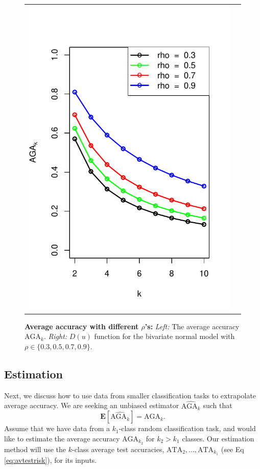 \documentclass[twoside,11pt]{article}
\newcommand{\E}{\textbf{E}}
\begin{document}
\begin{figure}[p]
\begin{tabular}{cc}
\includegraphics[scale = 0.6, clip = true, trim = 0.0in 0 0.2in 0.6in]{illus_rhos_avrisk.pdf}
\end{tabular}

\caption{\textbf{Average accuracy with different $\rho$'s:}
\emph{Left:} The average accuracy $\text{AGA}_k$. \emph{Right:} ${D}(u)$ function for the bivariate normal model with $\rho \in \{0.3, 0.5, 0.7, 0.9\}$.
}\label{fig:toy4}
\end{figure}

\subsection{Estimation}\label{sec:extrapolation_estimation}

Next, we discuss how to use data from smaller classification tasks to
extrapolate average accuracy.  
We are seeking an unbiased estimator $\widehat{\text{AGA}_k}$
such that %
\[
\E[\widehat{\text{AGA}_k}] = \text{AGA}_k.
\]
Assume that we have data from a
$k_1$-class random classification task, and would like to estimate the
average accuracy $\text{AGA}_{k_2}$ for $k_2>k_1$ classes.  
Our estimation method will use the $k$-class average test accuracies,
$\text{ATA}_2,...,\text{ATA}_{k_1}$ (see Eq \ref{eq:avtestrisk}), for
its inputs.
\end{document}
